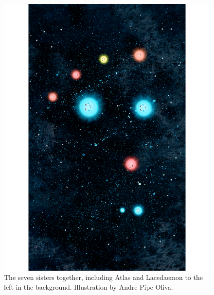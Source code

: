 \documentclass[main.tex]{subfiles}
\begin{document}
\begin{figure}
\includegraphics[width=\columnwidth]{ch1_3.pdf}
\caption{The seven sisters together, including Atlas and Lacedaemon to the left in the background.  Illustration by Andre Pipe Oliva.
\label{fig:fig3}}
\end{figure}
\end{document}
